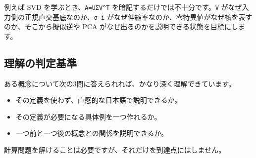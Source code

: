 \documentclass[
  11pt,
  a4paper,
]{ltjsarticle}
\providecommand{\tightlist}{%
  \setlength{\itemsep}{0pt}\setlength{\parskip}{0pt}}
\begin{document}
例えば SVD を学ぶとき、\texttt{A=UΣV\^{}T}
を暗記するだけでは不十分です。\texttt{V}
がなぜ入力側の正規直交基底なのか、\texttt{σ\_i}
がなぜ伸縮率なのか、零特異値がなぜ核を表すのか、そこから擬似逆や PCA
がなぜ出るのかを説明できる状態を目標にします。

\hypertarget{ux7406ux89e3ux306eux5224ux5b9aux57faux6e96}{%
\subsection{理解の判定基準}\label{ux7406ux89e3ux306eux5224ux5b9aux57faux6e96}}

ある概念について次の3問に答えられれば、かなり深く理解できています。

\begin{itemize}
\tightlist
\item
  その定義を使わず、直感的な日本語で説明できるか。
\item
  その定義が必要になる具体例を一つ作れるか。
\item
  一つ前と一つ後の概念との関係を説明できるか。
\end{itemize}

計算問題を解けることは必要ですが、それだけを到達点にはしません。
\end{document}
